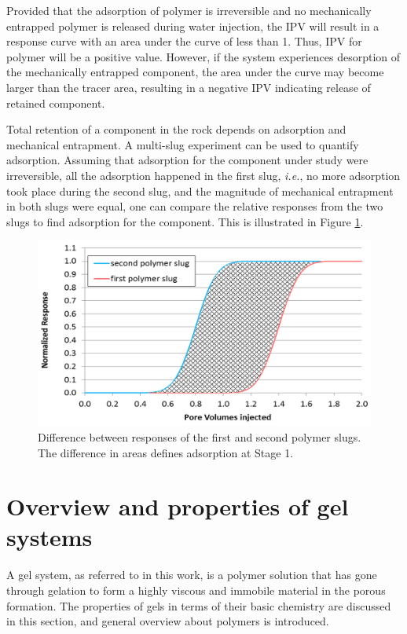 Provided that the adsorption of polymer is irreversible and no mechanically entrapped polymer is released during water injection, the IPV will result in a response curve with an area under the curve of less than 1. Thus, IPV for polymer will be a positive value. However, if the system experiences desorption of the mechanically entrapped component, the area under the curve may become larger than the tracer area, resulting in a negative IPV indicating release of retained component. 

Total retention of a component in the rock depends on adsorption and mechanical entrapment. A multi-slug experiment can be used to quantify adsorption. Assuming that adsorption for the component under study were irreversible, all the adsorption happened in the first slug, \textit{i.e.}, no more adsorption took place during the second slug, and the magnitude of mechanical entrapment in both slugs were equal, one can compare the relative responses from the two slugs to find adsorption for the component. This is illustrated in Figure \ref{fig:ipvRet3}.

\begin{figure}[h!]
    \centering
    \includegraphics[width=\textwidth]{img/fig/ipvRet3.png}
    \caption{Difference between responses of the first and second polymer slugs. The difference in areas defines adsorption at Stage 1.}
    \label{fig:ipvRet3} %
\end{figure}


\section{Overview and properties of gel systems}

A  gel system, as referred to in this work, is a polymer solution that has gone through gelation to form a highly viscous and immobile material in the porous formation. The properties of gels in terms of their basic chemistry are discussed in this section, and general overview about polymers is introduced.

